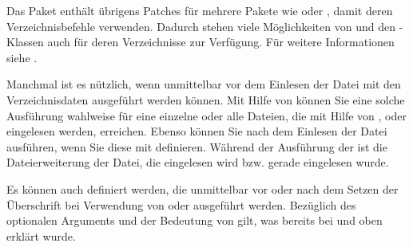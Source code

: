 Das Paket \href{https://www.ctan.org/pkg/scrhack}{}%
 enthält
übrigens Patches für mehrere Pakete wie 
oder , damit deren Verzeichnisbefehle
 verwenden. Dadurch stehen viele Möglichkeiten von
 und den \KOMAScript-Klassen auch für deren Verzeichnisse
zur Verfügung. Für weitere Informationen siehe
\cite{pkg:scrhack:manual}.%
\EndIndexGroup


\begin{Declaration}
\end{Declaration}
Manchmal ist es nützlich, wenn unmittelbar vor dem Einlesen der Datei mit den
Verzeichnisdaten  ausgeführt werden können. Mit Hilfe von
 können Sie eine solche Ausführung
wahlweise für eine einzelne  oder alle Dateien, die
mit Hilfe von ,
 oder 
eingelesen werden, erreichen. Ebenso können Sie  nach dem
Einlesen der Datei ausführen, wenn Sie diese mit 
definieren. Während der Ausführung der  ist
 die
Dateierweiterung der Datei, die eingelesen wird bzw. gerade eingelesen wurde.%
\EndIndexGroup


\begin{Declaration}
\end{Declaration}
Es können auch  definiert werden, die unmittelbar vor oder
nach dem Setzen der Überschrift bei Verwendung von
 oder 
ausgeführt werden. Bezüglich des optionalen Arguments und der Bedeutung von
 gilt, was
bereits bei  und
 oben erklärt wurde.%
\EndIndexGroup


